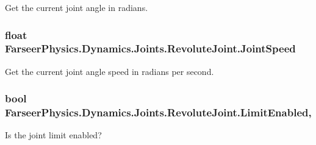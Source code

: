 Get the current joint angle in radians. 

\hypertarget{class_farseer_physics_1_1_dynamics_1_1_joints_1_1_revolute_joint_a92f200e7f0133f7903c642372d9afc4d}{
\subsubsection[{Joint\+Speed}]{\setlength{\rightskip}{0pt plus 5cm}float Farseer\+Physics.\+Dynamics.\+Joints.\+Revolute\+Joint.\+Joint\+Speed\hspace{0.3cm}{\ttfamily [get]}}}\label{class_farseer_physics_1_1_dynamics_1_1_joints_1_1_revolute_joint_a92f200e7f0133f7903c642372d9afc4d}


Get the current joint angle speed in radians per second. 

\hypertarget{class_farseer_physics_1_1_dynamics_1_1_joints_1_1_revolute_joint_a6aecb6df8ea5fb3efe6924a1cdbbcc48}{
\subsubsection[{Limit\+Enabled}]{\setlength{\rightskip}{0pt plus 5cm}bool Farseer\+Physics.\+Dynamics.\+Joints.\+Revolute\+Joint.\+Limit\+Enabled\hspace{0.3cm}{\ttfamily [get]}, {\ttfamily [set]}}}\label{class_farseer_physics_1_1_dynamics_1_1_joints_1_1_revolute_joint_a6aecb6df8ea5fb3efe6924a1cdbbcc48}


Is the joint limit enabled? 


